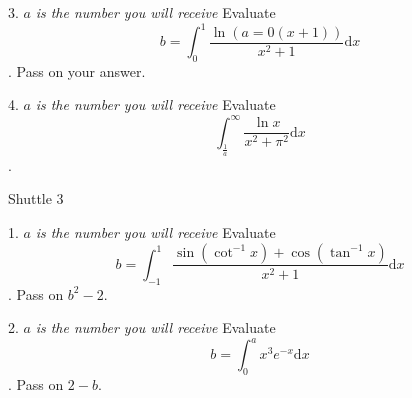 \documentclass[11pt, a4paper]{article}
\newcommand{\dd}{\mathrm{d}}
\begin{document}
\begin{enumerate}
3. $a$\textit{ is the number you will receive} \newline Evaluate $$b=\int_0^{1} \frac{\ln(a=0(x+1))}{x^2+1} \dd x$$. Pass on your answer. \newline  \newline \newline \newline \newline \newline   %


4. $a$\textit{ is the number you will receive} \newline Evaluate $$\int_{\frac{1}{a}}^{\infty} \frac{\ln{x}}{x^2+\pi^2} \dd x$$. 

\newpage

Shuttle 3

1. $a$\textit{ is the number you will receive} \newline Evaluate $$b=\int_{-1}^1 \frac{\sin(\cot^{-1}{x})+\cos(\tan^{-1}{x})}{x^2+1} \dd x$$. Pass on $b^2-2$. \newline  \newline \newline \newline \newline \newline

2. $a$\textit{ is the number you will receive} \newline Evaluate $$b=\int_0^{a} x^3e^{-x} \dd x$$. Pass on $2-b$. \newline  \newline \newline \newline \newline \newline 


\end{enumerate}
\end{document}
